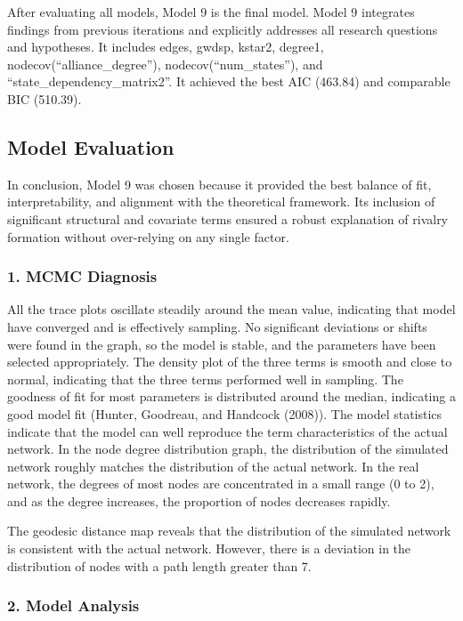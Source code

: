 \documentclass[
]{article}
\begin{document}
After evaluating all models, Model 9 is the final model. Model 9
integrates findings from previous iterations and explicitly addresses
all research questions and hypotheses. It includes edges, gwdsp, kstar2,
degree1, nodecov(``alliance\_degree''), nodecov(``num\_states''), and
``state\_dependency\_matrix2''. It achieved the best AIC (463.84) and
comparable BIC (510.39).

\subsection{Model Evaluation}\label{model-evaluation}

In conclusion, Model 9 was chosen because it provided the best balance
of fit, interpretability, and alignment with the theoretical framework.
Its inclusion of significant structural and covariate terms ensured a
robust explanation of rivalry formation without over-relying on any
single factor.

\subsubsection{1. MCMC Diagnosis}\label{mcmc-diagnosis}

All the trace plots oscillate steadily around the mean value, indicating
that model have converged and is effectively sampling. No significant
deviations or shifts were found in the graph, so the model is stable,
and the parameters have been selected appropriately. The density plot of
the three terms is smooth and close to normal, indicating that the three
terms performed well in sampling. The goodness of fit for most
parameters is distributed around the median, indicating a good model fit
(Hunter, Goodreau, and Handcock (2008)). The model statistics indicate
that the model can well reproduce the term characteristics of the actual
network. In the node degree distribution graph, the distribution of the
simulated network roughly matches the distribution of the actual
network. In the real network, the degrees of most nodes are concentrated
in a small range (0 to 2), and as the degree increases, the proportion
of nodes decreases rapidly.

The geodesic distance map reveals that the distribution of the simulated
network is consistent with the actual network. However, there is a
deviation in the distribution of nodes with a path length greater than
7.

\subsubsection{2. Model Analysis}\label{model-analysis}
\end{document}
